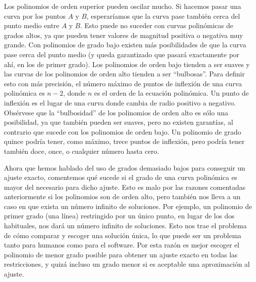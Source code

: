 \documentclass{article}
\begin{document}
Los polinomios de orden superior pueden oscilar mucho. Si hacemos pasar
una curva por los puntos $A$ y $B$, esperaríamos que la curva pase
también cerca del punto medio entre $A$ y $B$. Esto puede no suceder con
curvas polinómicas de grados altos, ya que pueden tener valores de
magnitud positiva o negativa muy grande. Con polinomios de grado bajo
existen más posibilidades de que la curva pase cerca del punto medio (y
queda garantizado que pasará exactamente por ahí, en los de primer
grado). Los polinomios de orden bajo tienden a ser suaves y las curvas
de los polinomios de orden alto tienden a ser ``bulbosas''. Para definir
esto con más precisión, el número máximo de puntos de inflexión de una
curva polinómica es $n-2$, donde $n$ es el orden de la ecuación
polinómica. Un punto de inflexión es el lugar de una curva donde cambia
de radio positivo a negativo. Obsérvese que la ``bulbosidad'' de los
polinomios de orden alto es sólo una posibilidad, ya que también pueden
ser suaves, pero no existen garantías, al contrario que sucede con los
polinomios de orden bajo. Un polinomio de grado quince podría tener,
como máximo, trece puntos de inflexión, pero podría tener también doce,
once, o cualquier número hasta cero.

Ahora que hemos hablado del uso de grados demasiado bajos para conseguir
un ajuste exacto, comentemos qué sucede si el grado de una curva
polinómica es mayor del necesario para dicho ajuste. Esto es malo por
las razones comentadas anteriormente si los polinomios son de orden
alto, pero también nos lleva a un caso en que exista un número infinito
de soluciones. Por ejemplo, un polinomio de primer grado (una línea)
restringido por un único punto, en lugar de los dos habituales, nos dará
un número infinito de soluciones. Esto nos trae el problema de cómo
comparar y escoger una solución única, lo que puede ser un problema
tanto para humanos como para el software. Por esta razón es mejor
escoger el polinomio de menor grado posible para obtener un ajuste
exacto en todas las restricciones, y quizá incluso un grado menor si es
aceptable una aproximación al ajuste.
\end{document}
